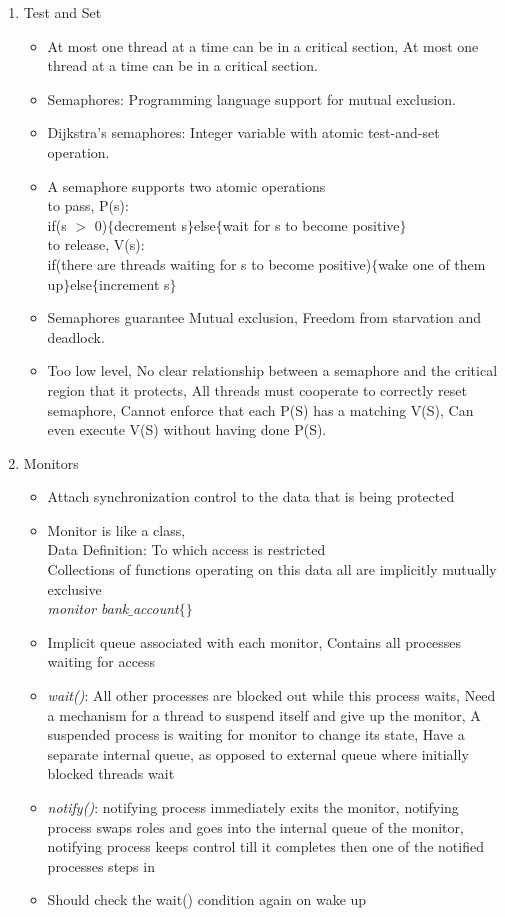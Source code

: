 \documentclass[a4paper]{article}
\begin{document}
\begin{enumerate}
\begin{itemize}
    \end{itemize}
    \item Test and Set
    \begin{itemize}
        \item At most one thread at a time can be in a critical section, At most one thread at a time can be in a critical section.
        \item Semaphores: Programming language support for mutual exclusion.
        \item Dijkstra's semaphores: Integer variable with atomic test-and-set operation.
        \item A semaphore supports two atomic operations\\
        to pass, P(s): \\
        if(s $>$ 0)$\{$decrement s$\}$else$\{$wait for s to become positive$\}$\\
        to release, V(s): \\
        if(there are threads waiting for s to become positive)$\{$wake one of them up$\}$else$\{$increment s$\}$
        \item Semaphores guarantee Mutual exclusion, Freedom from starvation and deadlock.
        \item Too low level, No clear relationship between a semaphore and the critical region that it protects, All threads must cooperate to correctly reset semaphore, Cannot enforce that each P(S) has a matching V(S), Can even execute V(S) without having done P(S).
    \end{itemize}
    \item Monitors
    \begin{itemize}
        \item Attach synchronization control to the data that is being protected
        \item Monitor is like a class,\\
        Data Definition: To which access is restricted\\
        Collections of functions operating on this data all are implicitly mutually exclusive\\
        \textit{monitor bank$\_$account$\{\}$}
        \item Implicit queue associated with each monitor, Contains all processes waiting for access
        \item \textit{wait()}: All other processes are blocked out while this process waits, Need a mechanism for a thread to suspend itself and give up the monitor, A suspended process is waiting for monitor to change its state, Have a separate internal queue, as opposed to external queue where initially blocked threads wait
        \item \textit{notify()}: notifying process immediately exits the monitor, notifying process swaps roles and goes into the internal queue of the monitor, notifying process keeps control till it completes then one of the notified processes steps in
        \item Should check the wait() condition again on wake up
    \end{itemize}
\end{enumerate}
\end{document}
